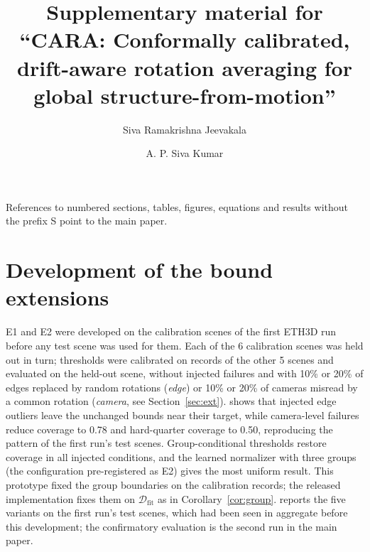\documentclass[preprint,12pt]{elsarticle}
\begin{document}
\begin{frontmatter}
\title{Supplementary material for ``CARA: Conformally calibrated, drift-aware rotation averaging for global structure-from-motion''}
\author[a]{Siva Ramakrishna Jeevakala}
\author[b]{A. P. Siva Kumar}
\end{frontmatter}

References to numbered sections, tables, figures, equations and results without the prefix S point to the main paper.


\clearpage

\clearpage
\section{Development of the bound extensions}\label{sec:s5}
E1 and E2 were developed on the calibration scenes of the first ETH3D run before any test scene was used for them. Each of the 6 calibration scenes was held out in turn; thresholds were calibrated on records of the other 5 scenes and evaluated on the held-out scene, without injected failures and with 10\% or 20\% of edges replaced by random rotations (\emph{edge}) or 10\% or 20\% of cameras misread by a common rotation (\emph{camera}, see Section~\ref{sec:ext}).  shows that injected edge outliers leave the unchanged bounds near their target, while camera-level failures reduce coverage to 0.78 and hard-quarter coverage to 0.50, reproducing the pattern of the first run's test scenes. Group-conditional thresholds restore coverage in all injected conditions, and the learned normalizer with three groups (the configuration pre-registered as E2) gives the most uniform result. This prototype fixed the group boundaries on the calibration records; the released implementation fixes them on $\mathcal{D}_{\mathrm{fit}}$ as in Corollary~\ref{cor:group}.  reports the five variants on the first run's test scenes, which had been seen in aggregate before this development; the confirmatory evaluation is the second run in the main paper.



\end{document}
